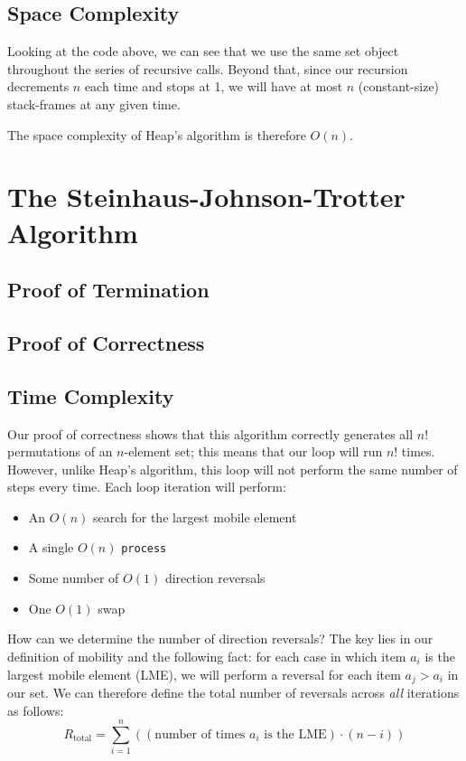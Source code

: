 \documentclass[10pt, oneside]{article}   	%
\begin{document}
\subsection{Space Complexity}

Looking at the code above, we can see that we use the same set object throughout the series of recursive calls. Beyond that, since our recursion decrements $n$ each time and stops at 1, we will have at most $n$ (constant-size) stack-frames at any given time.

The space complexity of Heap's algorithm is therefore $O(n)$.

\section{The Steinhaus-Johnson-Trotter Algorithm}

\newtheorem{axiom}{Axiom}[section]
\newtheorem{lemma}{Lemma}[section]

\subsection{Proof of Termination}

\subsection{Proof of Correctness}

\subsection{Time Complexity}

Our proof of correctness shows that this algorithm correctly generates all $n!$ permutations of an $n$-element set; this means that our loop will run $n!$ times. However, unlike Heap's algorithm, this loop will not perform the same number of steps every time. Each loop iteration will perform:
\begin{itemize}
	\item An $O(n)$ search for the largest mobile element
	\item A single $O(n)$ \texttt{process}
	\item Some number of $O(1)$ direction reversals
	\item One $O(1)$ swap
\end{itemize}
How can we determine the number of direction reversals? The key lies in our definition of mobility and the following fact: for each case in which item $a_{i}$ is the largest mobile element (LME), we will perform a reversal for each item $a_{j} > a_{i}$ in our set. We can therefore define the total number of reversals across \emph{all} iterations as follows:
\[
	R_{\text{total}} = \sum_{i = 1}^{n} \left( (\text{number of times $a_{i}$ is the LME}) \cdot (n - i) \right)
\]
\end{document}

